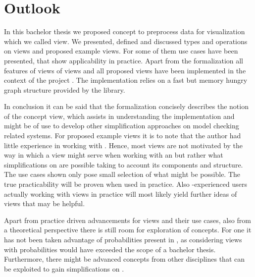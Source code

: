 \documentclass[preview]{standalone}
\begin{document}
\section{Outlook}

In this bachelor thesis we proposed concept to preprocess data for visualization which we called view. We presented, defined and discussed types and operations on views and proposed example views. For some of them use cases have been presented, that show applicability in practice. Apart from the formalization all features of views of views and all proposed views have been implemented in the context of the project \pmcvis. The implementation relies on a fast but memory hungry graph structure provided by the \jgrapht library.

In conclusion it can be said that the formalization concisely describes the notion of the concept view, which assists in understanding the implementation and might be of use to develop other simplification approaches on model checking related systems. For proposed example views it is to note that the author had little experience in working with \mdpsN. Hence, most views are not motivated by the way in which a view might serve when working with an \mdpN but rather what simplifications on \mdpsN are possible taking to account its components and structure. The use cases shown only pose small selection of what might be possible. The true practicability will be proven when used in practice. Also \mdpN-experienced users actually working with views in practice will most likely yield further ideas of views that may be helpful.

Apart from practice driven advancements for views and their use cases, also from a theoretical perspective there is still room for exploration of concepts. For one it has not been taken advantage of probabilities present in \mdpsN, as considering views with probabilities would have exceeded the scope of a bachelor thesis. Furthermore, there might be advanced concepts from other disciplines that can be exploited to gain simplifications on \mdpsN.
\end{document}
